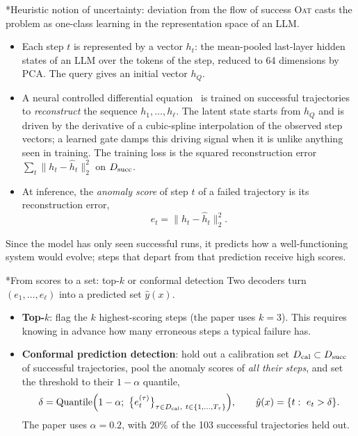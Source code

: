\documentclass[11pt]{article}
\makeatletter
\theoremstyle{definition}
\renewcommand\subsection{\@startsection{subsection}{2}{\z@}{-3.25ex\@plus -1ex \@minus -.2ex}{1.5ex \@plus .2ex}{\normalfont\large\bfseries\color{secblue}}}
\makeatother
\begin{document}
\subsection*{Heuristic notion of uncertainty: deviation from the flow of success}
\textsc{Oat} casts the problem as one-class learning in the representation space of an LLM.
\begin{itemize}[leftmargin=1.5em]
\item Each step $t$ is represented by a vector $h_t$: the mean-pooled last-layer hidden states of an LLM over the tokens of the step, reduced to 64 dimensions by PCA. The query gives an initial vector $h_Q$.
\item A neural controlled differential equation~\cite{kidger2020} is trained on successful trajectories to \emph{reconstruct} the sequence $h_1,\dots,h_\ell$. The latent state starts from $h_Q$ and is driven by the derivative of a cubic-spline interpolation of the observed step vectors; a learned gate damps this driving signal when it is unlike anything seen in training. The training loss is the squared reconstruction error $\sum_t\|h_t-\hat h_t\|_2^2$ on $D_{\rm succ}$.
\item At inference, the \emph{anomaly score} of step $t$ of a failed trajectory is its reconstruction error,
\begin{equation}\label{eq:oat-score}
e_t=\|h_t-\hat h_t\|_2^2 .
\end{equation}
\end{itemize}
Since the model has only seen successful runs, it predicts how a well-functioning system would evolve; steps that depart from that prediction receive high scores.

\subsection*{From scores to a set: top-$k$ or conformal detection}
Two decoders turn $(e_1,\dots,e_\ell)$ into a predicted set $\hat y(x)$.
\begin{itemize}[leftmargin=1.5em]
\item \textbf{Top-$k$}: flag the $k$ highest-scoring steps (the paper uses $k=3$). This requires knowing in advance how many erroneous steps a typical failure has.
\item \textbf{Conformal prediction detection}: hold out a calibration set $D_{\rm cal}\subset D_{\rm succ}$ of successful trajectories, pool the anomaly scores of \emph{all their steps}, and set the threshold to their $1-\alpha$ quantile,
\begin{equation}\label{eq:oat-cp}
\delta=\mathrm{Quantile}\Big(1-\alpha;\ \big\{e^{(\tau)}_t\big\}_{\tau\in D_{\rm cal},\ t\in\{1,\dots,T_\tau\}}\Big),\qquad \hat y(x)=\{t:\ e_t>\delta\}.
\end{equation}
The paper uses $\alpha=0.2$, with $20\%$ of the 103 successful trajectories held out.
\end{itemize}
\end{document}
